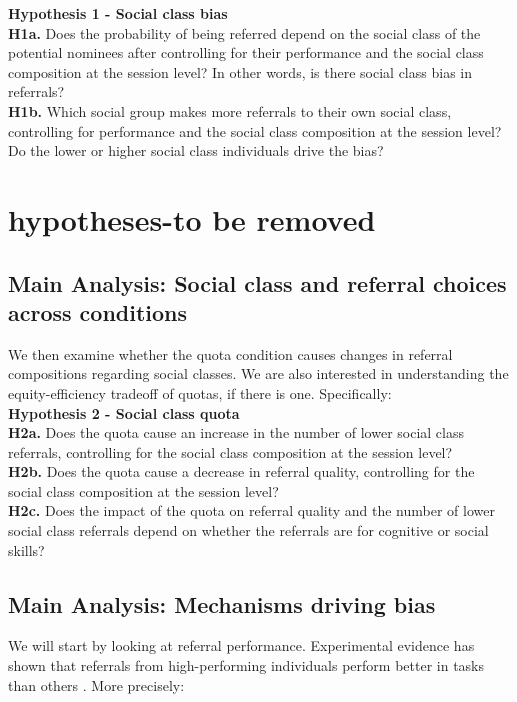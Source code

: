 \documentclass[11pt,a4paper,oneside]{article}
\begin{document}
\noindent\textbf{Hypothesis 1 - Social class bias}\\
\noindent\textbf{H1a.} Does the probability of being referred depend on the social class of the potential nominees after controlling for their performance and the social class composition at the session level? In other words, is there social class bias in referrals?\\
\noindent\textbf{H1b.} Which social group makes more referrals to their own social class, controlling for performance and the social class composition at the session level? Do the lower or higher social class individuals drive the bias?

\section{hypotheses-to be removed}
\subsection{Main Analysis: Social class and referral choices across conditions}
We then examine whether the quota condition causes changes in referral compositions regarding social classes. We are also interested in understanding the equity-efficiency tradeoff of quotas, if there is one. Specifically:\\

\noindent\textbf{Hypothesis 2 - Social class quota}\\
\noindent\textbf{H2a.} Does the quota cause an increase in the number of lower social class referrals, controlling for the social class composition at the session level?  \\
\noindent\textbf{H2b.} Does the quota cause a decrease in referral quality, controlling for the social class composition at the session level? \\
\noindent\textbf{H2c.} Does the impact of the quota on referral quality and the number of lower social class referrals depend on whether the referrals are for cognitive or social skills?

\subsection{Main Analysis: Mechanisms driving bias}
We will start by looking at referral performance. Experimental evidence has shown that referrals from high-performing individuals perform better in tasks than others \citep{beaman_who_2012, beaman_job_2018,pallais_why_2016}. More precisely:\\
\end{document}
